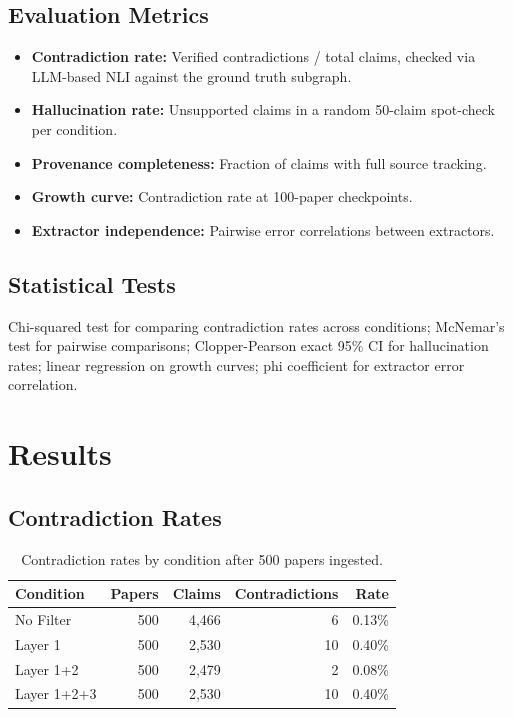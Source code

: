 \documentclass[11pt,a4paper]{article}
\begin{document}
\subsection{Evaluation Metrics}

\begin{itemize}
    \item \textbf{Contradiction rate:} Verified contradictions / total claims, checked via LLM-based NLI against the ground truth subgraph.
    \item \textbf{Hallucination rate:} Unsupported claims in a random 50-claim spot-check per condition.
    \item \textbf{Provenance completeness:} Fraction of claims with full source tracking.
    \item \textbf{Growth curve:} Contradiction rate at 100-paper checkpoints.
    \item \textbf{Extractor independence:} Pairwise error correlations between extractors.
\end{itemize}

\subsection{Statistical Tests}

Chi-squared test for comparing contradiction rates across conditions; McNemar's test for pairwise comparisons; Clopper-Pearson exact 95\% CI for hallucination rates; linear regression on growth curves; phi coefficient for extractor error correlation.

\section{Results}

\subsection{Contradiction Rates}

\begin{table}[h]
\centering
\caption{Contradiction rates by condition after 500 papers ingested.}
\label{tab:contradiction}
\begin{tabular}{lrrrr}
\toprule
Condition & Papers & Claims & Contradictions & Rate \\
\midrule
No Filter & 500 & 4{,}466 & 6 & 0.13\% \\
Layer 1 & 500 & 2{,}530 & 10 & 0.40\% \\
Layer 1+2 & 500 & 2{,}479 & 2 & 0.08\% \\
Layer 1+2+3 & 500 & 2{,}530 & 10 & 0.40\% \\
\bottomrule
\end{tabular}
\end{table}
\end{document}
